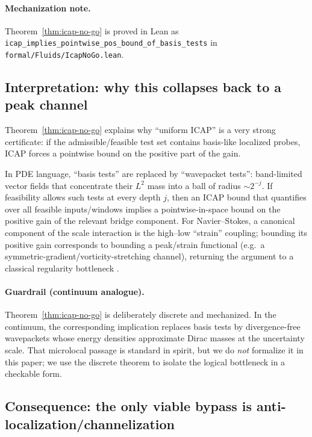 \documentclass[11pt]{article}
\begin{document}
\paragraph{Mechanization note.}
Theorem~\ref{thm:icap-no-go} is proved in Lean as
\nolinkurl{icap_implies_pointwise_pos_bound_of_basis_tests}
in \texttt{formal/Fluids/IcapNoGo.lean}.

\subsection{Interpretation: why this collapses back to a peak channel}

Theorem~\ref{thm:icap-no-go} explains why ``uniform ICAP'' is a very strong certificate:
if the admissible/feasible test set contains basis-like localized probes, ICAP forces a
pointwise bound on the positive part of the gain.

In PDE language, ``basis tests'' are replaced by ``wavepacket tests'': band-limited vector fields
that concentrate their $L^2$ mass into a ball of radius $\sim 2^{-j}$.
If feasibility allows such tests at every depth $j$, then an ICAP bound that quantifies over
all feasible inputs/windows implies a pointwise-in-space bound on the positive gain of the
relevant bridge component.
For Navier--Stokes, a canonical component of the scale interaction is the high--low
``strain'' coupling; bounding its positive gain corresponds to bounding a peak/strain functional
(e.g.\ a symmetric-gradient/vorticity-stretching channel), returning the argument to a classical
regularity bottleneck \citep{majda_bertozzi_vif,bkm_1984,serrin1962interior}.

\paragraph{Guardrail (continuum analogue).}
Theorem~\ref{thm:icap-no-go} is deliberately discrete and mechanized.
In the continuum, the corresponding implication replaces basis tests by divergence-free wavepackets
whose energy densities approximate Dirac masses at the uncertainty scale.
That microlocal passage is standard in spirit, but we do \emph{not} formalize it in this paper;
we use the discrete theorem to isolate the logical bottleneck in a checkable form.

\subsection{Consequence: the only viable bypass is anti-localization/channelization}
\end{document}
